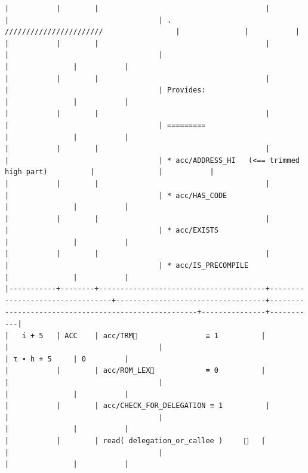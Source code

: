 \documentclass[varwidth=\maxdimen,margin=0.5cm,multi={verbatim}]{standalone}
\begin{document}
\begin{verbatim}
|           |        |                                       |                                 |                                   | .           ///////////////////////                 |               |           |
|           |        |                                       |                                 |                                   |                                                     |               |           |
|           |        |                                       |                                 |                                   | Provides:                                           |               |           |
|           |        |                                       |                                 |                                   | =========                                           |               |           |
|           |        |                                       |                                 |                                   | * acc/ADDRESS_HI   (<== trimmed high part)          |               |           |
|           |        |                                       |                                 |                                   | * acc/HAS_CODE                                      |               |           |
|           |        |                                       |                                 |                                   | * acc/EXISTS                                        |               |           |
|           |        |                                       |                                 |                                   | * acc/IS_PRECOMPILE                                 |               |           |
|-----------+--------+---------------------------------------+---------------------------------+-----------------------------------+-----------------------------------------------------+---------------+-----------|
|   i + 5   | ACC    | acc/TRM🚩                ≡ 1          |                                 |                                   |                                                     | τ ∙ h + 5     | 0         |
|           |        | acc/ROM_LEX🚩            ≡ 0          |                                 |                                   |                                                     |               |           |
|           |        | acc/CHECK_FOR_DELEGATION ≡ 1          |                                 |                                   |                                                     |               |           |
|           |        | read( delegation_or_callee )     👋   |                                 |                                   |                                                     |               |           |

\end{verbatim}
\end{document}
